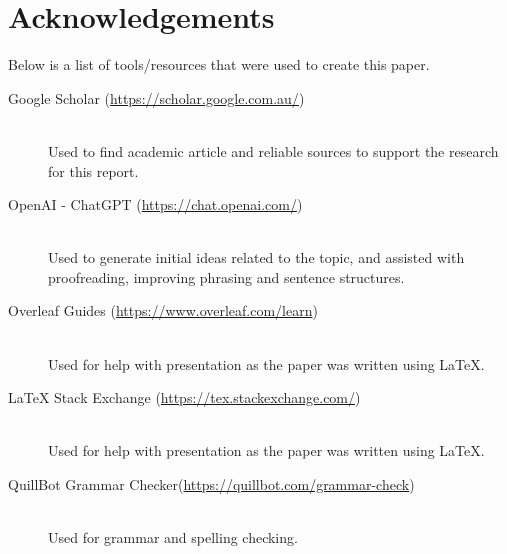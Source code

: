 \documentclass{article}
\begin{document}
\section*{Acknowledgements}
Below is a list of tools/resources that were used to create this paper.

\begin{description}
\item[Google Scholar (\url{https://scholar.google.com.au/})] \hfill \\
Used to find academic article and reliable sources to support the research for this report.

\item[OpenAI - ChatGPT (\url{https://chat.openai.com/})] \hfill \\
Used to generate initial ideas related to the topic, and assisted with proofreading, improving phrasing and sentence structures.

\item[Overleaf Guides (\url{https://www.overleaf.com/learn})]  \hfill \\
Used for help with presentation as the paper was written using LaTeX.

\item[LaTeX Stack Exchange (\url{https://tex.stackexchange.com/})] \hfill \\
Used for help with presentation as the paper was written using LaTeX.

\item[QuillBot Grammar Checker(\url{https://quillbot.com/grammar-check})] \hfill \\
Used for grammar and spelling checking.
\end{description}

\printbibliography
\end{document}
